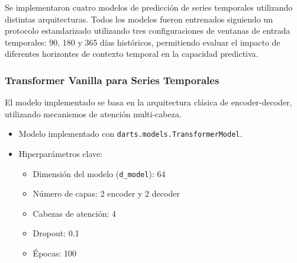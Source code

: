 \documentclass[12pt]{article}
\begin{document}
Se implementaron cuatro modelos de predicción de series temporales utilizando distintas arquitecturas.
Todos los modelos fueron entrenados siguiendo un protocolo estandarizado utilizando tres configuraciones de ventanas de entrada temporales: 90, 180 y 365 días históricos, permitiendo evaluar el impacto de diferentes horizontes de contexto temporal en la capacidad predictiva.



\subsubsection{Transformer Vanilla para Series Temporales}

El modelo implementado se basa en la arquitectura clásica de encoder-decoder, utilizando mecanismos de atención multi-cabeza.

\begin{itemize}
\item Modelo implementado con \texttt{darts.models.TransformerModel}.
\item Hiperparámetros clave:
\begin{itemize}
\item Dimensión del modelo (\texttt{d\_model}): 64
\item Número de capas: 2 encoder y 2 decoder
\item Cabezas de atención: 4
\item Dropout: 0.1
\item Épocas: 100
\end{itemize}
\end{itemize}
\end{document}
